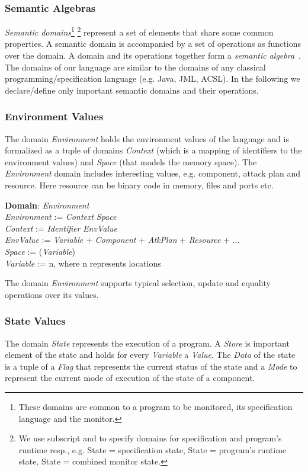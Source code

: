 \documentclass[conference]{IEEEtran}
\begin{document}
\subsubsection{Semantic Algebras}
\emph{Semantic domains}\footnote[1]{These domains are common to a program to be monitored, its specification language and the monitor.} \footnote[2]{We use subscript  and  to specify domains for specification and program's runtime resp., e.g. State = specification state, State = program's runtime state, State = combined monitor state.} represent a set of elements that share some common properties. A semantic domain is accompanied by a set of operations as functions over the domain. A domain and its operations together form a \emph{semantic algebra}~\cite{Schmidt86}.  The domains of our language are similar to the domains of any classical programming/specification language (e.g. Java, JML, ACSL). In the following we declare/define only important semantic domains and their operations.

\subsubsection*{Environment Values}
The domain \emph{Environment} holds the environment values of the language and is formalized as a tuple of domains \emph{Context} (which is a mapping of identifiers to the environment values) and \emph{Space} (that models the memory space). The \emph{Environment} domain includes interesting values, e.g. component, attack plan and resource. Here resource can be binary code in memory, files and ports etc.

\noindent\textbf{Domain}: \emph{Environment}\\
\emph{Environment} := \emph{Context}  \emph{Space}\\
\emph{Context} := \emph{Identifier}  \emph{EnvValue}
\\\emph{EnvValue} := \emph{Variable} + \emph{Component} + \emph{AtkPlan} + \emph{Resource} + ...
\\\emph{Space} := (\emph{Variable})\\
\emph{Variable} := n, where n   represents locations


The domain \emph{Environment} supports typical selection, update and equality operations over its values.

\subsubsection*{State Values}
The domain \emph{State} represents the execution of a program. A \emph{Store} is important element of the state and holds for every \emph{Variable} a \emph{Value}. The \emph{Data} of the state is a tuple of a \emph{Flag} that represents the current status of the state and a \emph{Mode} to represent the current mode of execution of the state of a component.
\end{document}

